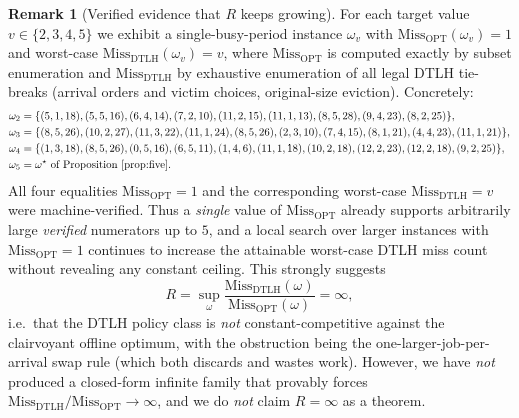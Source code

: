 \documentclass{amsart}
\theoremstyle{definition}
\newtheorem{remark}[theorem]{Remark}
\begin{document}
\begin{remark}[Verified evidence that $R$ keeps growing]\label{rem:grow}
For each target value $v\in\{2,3,4,5\}$ we exhibit a single-busy-period instance
$\omega_v$ with $\mathrm{Miss}_{\mathrm{OPT}}(\omega_v)=1$ and worst-case
$\mathrm{Miss}_{\mathrm{DTLH}}(\omega_v)=v$, where $\mathrm{Miss}_{\mathrm{OPT}}$
is computed exactly by subset enumeration and $\mathrm{Miss}_{\mathrm{DTLH}}$ by
exhaustive enumeration of all legal DTLH tie-breaks (arrival orders and victim
choices, original-size eviction). Concretely:
\begin{align*}
\omega_2&=\{(5,1,18),(5,5,16),(6,4,14),(7,2,10),(11,2,15),(11,1,13),(8,5,28),(9,4,23),(8,2,25)\},\\
\omega_3&=\{(8,5,26),(10,2,27),(11,3,22),(11,1,24),(8,5,26),(2,3,10),(7,4,15),(8,1,21),(4,4,23),(11,1,21)\},\\
\omega_4&=\{(1,3,18),(8,5,26),(0,5,16),(6,5,11),(1,4,6),(11,1,18),(10,2,18),(12,2,23),(12,2,18),(9,2,25)\},\\
\omega_5&=\omega^\star\text{ of Proposition~\ref{prop:five}}.
\end{align*}
All four equalities $\mathrm{Miss}_{\mathrm{OPT}}=1$ and the corresponding
worst-case $\mathrm{Miss}_{\mathrm{DTLH}}=v$ were machine-verified. Thus a
\emph{single} value of $\mathrm{Miss}_{\mathrm{OPT}}$ already supports
arbitrarily large \emph{verified} numerators up to $5$, and a local search over
larger instances with $\mathrm{Miss}_{\mathrm{OPT}}=1$ continues to increase the
attainable worst-case DTLH miss count without revealing any constant ceiling.
This strongly suggests
\[
R=\sup_\omega
\frac{\mathrm{Miss}_{\mathrm{DTLH}}(\omega)}{\mathrm{Miss}_{\mathrm{OPT}}(\omega)}
=\infty,
\]
i.e.\ that the DTLH policy class is \emph{not} constant-competitive against the
clairvoyant offline optimum, with the obstruction being the
one-larger-job-per-arrival swap rule (which both discards and wastes work).
However, we have \emph{not} produced a closed-form infinite family that provably
forces
$\mathrm{Miss}_{\mathrm{DTLH}}/\mathrm{Miss}_{\mathrm{OPT}}\to\infty$, and we do
\emph{not} claim $R=\infty$ as a theorem.
\end{remark}
\end{document}
